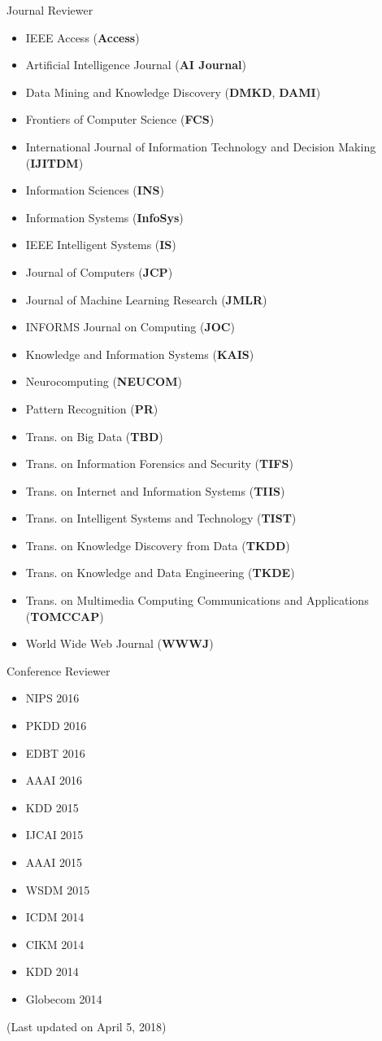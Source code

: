 \documentclass[margin, 9pt]{res}
\begin{document}
\begin{resume}
{Journal Reviewer}
\begin{itemize}
\item IEEE Access (\textbf{Access})
\item Artificial Intelligence Journal (\textbf{AI Journal})	
\item Data Mining and Knowledge Discovery (\textbf{DMKD}, \textbf{DAMI})
\item Frontiers of Computer Science (\textbf{FCS})
\item International Journal of Information Technology and Decision Making (\textbf{IJITDM})
\item Information Sciences (\textbf{INS})
\item Information Systems (\textbf{InfoSys})
\item IEEE Intelligent Systems (\textbf{IS})
\item Journal of Computers (\textbf{JCP})
\item Journal of Machine Learning Research (\textbf{JMLR})
\item INFORMS Journal on Computing (\textbf{JOC})
\item Knowledge and Information Systems (\textbf{KAIS})
\item Neurocomputing (\textbf{NEUCOM})
\item Pattern Recognition (\textbf{PR})
\item Trans. on Big Data (\textbf{TBD})
\item Trans. on Information Forensics and Security (\textbf{TIFS})
\item Trans. on Internet and Information Systems (\textbf{TIIS})
\item Trans. on Intelligent Systems and Technology (\textbf{TIST})
\item Trans. on Knowledge Discovery from Data (\textbf{TKDD})
\item Trans. on Knowledge and Data Engineering (\textbf{TKDE})
\item Trans. on Multimedia Computing Communications and Applications (\textbf{TOMCCAP})
\item World Wide Web Journal (\textbf{WWWJ})
\end{itemize}
\vspace{-0.1in}

{Conference Reviewer}
\vspace{-0.15in}
\begin{multicols}{3}
\begin{itemize}
\item NIPS 2016
\item PKDD 2016
\item EDBT 2016
\item AAAI 2016
\item KDD 2015
\item IJCAI 2015
\item AAAI 2015
\item WSDM 2015
\item ICDM 2014
\item CIKM 2014
\item KDD 2014
\item Globecom 2014
\end{itemize}
\end{multicols}

(Last updated on April 5, 2018)
\end{resume}
\end{document}
